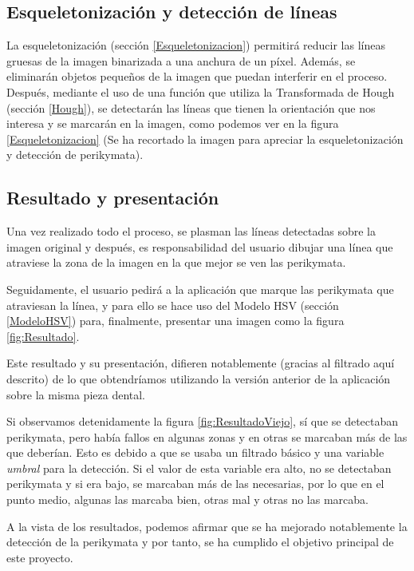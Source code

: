 \subsection{Esqueletonización y detección de líneas}
La esqueletonización (sección \ref{Esqueletonizacion}) permitirá reducir las líneas gruesas de la imagen binarizada a una anchura de un píxel. Además, se eliminarán objetos pequeños de la imagen que puedan interferir en el proceso. Después, mediante el uso de una función que utiliza la Transformada de Hough (sección \ref{Hough}), se detectarán las líneas que tienen la orientación que nos interesa y se marcarán en la imagen, como podemos ver en la figura \ref{Esqueletonizacion} (Se ha recortado la imagen para apreciar la esqueletonización y detección de perikymata).


\subsection{Resultado y presentación}
Una vez realizado todo el proceso, se plasman las líneas detectadas sobre la imagen original y después, es responsabilidad del usuario dibujar una línea que atraviese la zona de la imagen en la que mejor se ven las perikymata.

Seguidamente, el usuario pedirá a la aplicación que marque las perikymata que atraviesan la línea, y para ello se hace uso del Modelo HSV (sección \ref{ModeloHSV}) para, finalmente, presentar una imagen como la figura \ref{fig:Resultado}.

Este resultado y su presentación, difieren notablemente (gracias al filtrado aquí descrito) de lo que obtendríamos utilizando la versión anterior de la aplicación sobre la misma pieza dental. 

Si observamos detenidamente la figura \ref{fig:ResultadoViejo}, sí que se detectaban perikymata, pero había fallos en algunas zonas y en otras se marcaban más de las que deberían. Esto es debido a que se usaba un filtrado básico y una variable \textit{umbral} para la detección. Si el valor de esta variable era alto, no se detectaban perikymata y si era bajo, se marcaban más de las necesarias, por lo que en el punto medio, algunas las marcaba bien, otras mal y otras no las marcaba.

A la vista de los resultados, podemos afirmar que se ha mejorado notablemente la detección de la perikymata y por tanto, se ha cumplido el objetivo principal de este proyecto.

